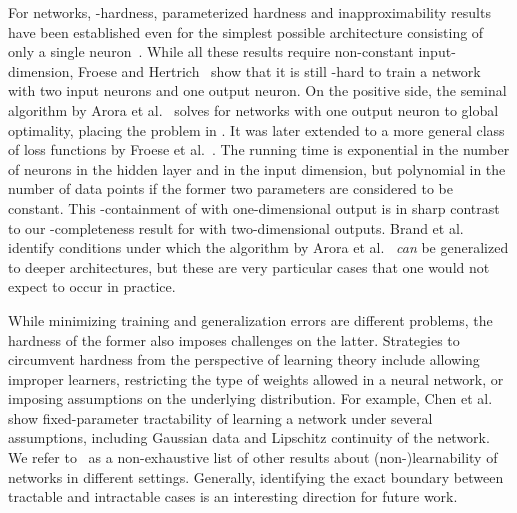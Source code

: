For \ReLU networks, \NP-hardness, parameterized hardness and inapproximability results have been established even for the simplest possible architecture consisting of only a single \ReLU neuron~\cite{Boob2022_Complexity, Dey2020_Approximation, Froese2022_Parameterized, Goel2021_Hardness}.  %
While all these results require non-constant input-dimension, Froese and Hertrich~\cite{Froese2023_FixedDimension} show that it is still \NP-hard to train a \twolayer \ReLU network with two input neurons and one output neuron.
On the positive side, the seminal algorithm by Arora et al.~\cite{Arora2018_Understanding} solves \ERM for \twolayer \ReLU networks with one output neuron to global optimality, placing the problem in \NP.
It was later extended to a more general class of loss functions by Froese et al.~\cite{Froese2022_Parameterized}.
The running time is exponential in the number of neurons in the hidden layer and in the input dimension, but polynomial in the number of data points if the former two parameters are considered to be constant.
This \NP-containment of \ERM with one-dimensional output is in sharp contrast to our \ER-completeness result for \trainNN with two-dimensional outputs.
Brand et al.~\cite{brand2023new} identify conditions under which the algorithm by Arora et al.~\cite{Arora2018_Understanding} \emph{can} be generalized to deeper architectures, but these are very %
particular  %
cases that one would not expect to occur in practice.

While minimizing training and generalization errors are different problems, the hardness of the former also imposes challenges on the latter.
Strategies to circumvent hardness from the perspective of learning theory include allowing improper learners, restricting the type of weights allowed in a neural network, or imposing assumptions on the underlying distribution.
For example, Chen et al.~\cite{Chen2022_LearningFTP} show fixed-parameter tractability of learning a \ReLU network under several assumptions, including Gaussian data and Lipschitz continuity of the network.
We refer to~\cite{Bakshi2019_Learning, Chen2022_Hardness, Diakonikolas2020_Approximation, Goel2017_ReliablyLearning, Goel2019_Learning, Goel2018_Learning}
%
as a non-exhaustive list of other results about (non-)learnability of \ReLU networks in different settings. Generally, identifying the exact boundary between tractable and intractable cases is an interesting direction for future work.

